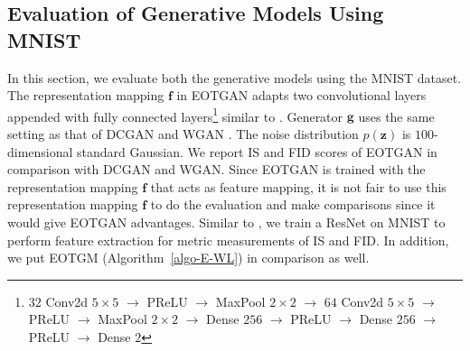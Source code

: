 \subsection{Evaluation of Generative Models Using MNIST}
In this section, we evaluate both the generative models using the MNIST dataset.
The representation mapping $\bm{f}$ in EOTGAN adapts two convolutional layers
appended with fully connected layers\footnote{$32$ Conv2d $5 \times5$
  $\rightarrow$ PReLU $\rightarrow$ MaxPool $2\times2$ $\rightarrow$
  $64$ Conv2d $5\times5$ $\rightarrow$ PReLU $\rightarrow$ MaxPool
  $2\times2$ $\rightarrow$ Dense $256$ $\rightarrow$ PReLU
  $\rightarrow$ Dense $256$ $\rightarrow$ PReLU $\rightarrow$ Dense
  $2$}
similar to \cite{1467314}\cite{1640964}. Generator $\bm{g}$ uses the same
setting as that of DCGAN \cite{2015arXiv151106434R} and WGAN \cite{2017arXiv170107875A}. The noise distribution $p(\bm{z})$ is $100$-dimensional standard Gaussian.
We report IS and FID scores of EOTGAN in comparison with DCGAN and WGAN. Since EOTGAN is trained with the representation mapping $\bm{f}$ that
acts as feature mapping, it is not fair to use this representation mapping $\bm{f}$ to do the
evaluation and make comparisons since it would give EOTGAN
advantages. Similar to \cite{2018arXiv180607755X}, we train a
ResNet on MNIST to perform feature extraction for metric measurements
of IS and FID. In addition, we put EOTGM (Algorithm~\ref{algo-E-WL}) in comparison as well.

